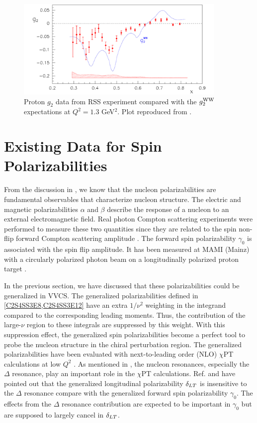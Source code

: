 \begin{figure}[tb!]
  \centering
  \includegraphics[width=0.9\textwidth]{figs/g2_RSS.pdf}
  \caption[Proton $g_2$ data from RSS experiment.]{Proton $g_2$ data from RSS experiment compared with the $g_2^{\mathrm{WW}}$ expectations at $Q^2=1.3$ GeV${}^2$. Plot reproduced from \cite{Wesselmann2007}. \label{C4S1F4}}
\end{figure}

\section{Existing Data for Spin Polarizabilities}
\label{C4S2}

From the discussion in , we know that the nucleon polarizabilities are fundamental observables that characterize nucleon structure. The electric and magnetic polarizabilities $\alpha$ and $\beta$ describe the response of a nucleon to an external electromagnetic field. Real photon Compton scattering experiments were performed to measure these two quantities since they are related to the spin non-flip forward Compton scattering amplitude \cite{Olmos2001,Tonnison1998}. The forward spin polarizability $\gamma_0$ is associated with the spin flip amplitude. It has been measured at MAMI (Mainz) with a circularly polarized photon beam on a longitudinally polarized proton target \cite{Ahrens2001}.

In the previous section, we have discussed that these polarizabilities could be generalized in VVCS. The generalized polarizabilities defined in \cref{C2S4SS3E8,C2S4SS3E12} have an extra $1/\nu^2$ weighting in the integrand compared to the corresponding leading moments. Thus, the contribution of the large-$\nu$ region to these integrals are suppressed by this weight. With this suppression effect, the generalized spin polarizabilities become a perfect tool to probe the nucleon structure in the chiral perturbation region. The generalized polarizabilities have been evaluated with next-to-leading order (NLO) $\chi$PT calculations at low $Q^2$ \cite{Bernard2003,Kao2003}. As mentioned in , the nucleon resonances, especially the $\Delta$ resonance, play an important role in the $\chi$PT calculations. Ref. \cite{Bernard2003} and \cite{Kao2003} have pointed out that the generalized longitudinal polarizability $\delta_{LT}$ is insensitive to the $\Delta$ resonance compare with the generalized forward spin polarizability $\gamma_0$. The effects from the $\Delta$ resonance contribution are expected to be important in $\gamma_0$ but are supposed to largely cancel in $\delta_{LT}$.

